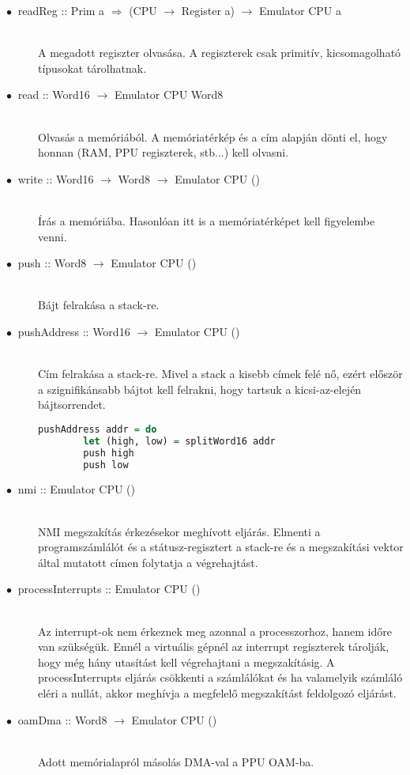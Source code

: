 \begin{description}
	\item[$\bullet\:$ readReg :: Prim a $\Rightarrow$ (CPU $\rightarrow$ Register a) $\rightarrow$ Emulator CPU a] \hfill \\
	A megadott regiszter olvasása. A regiszterek csak primitív, kicsomagolható típusokat tárolhatnak.
	\item[$\bullet\:$ read :: Word16 $\rightarrow$ Emulator CPU Word8] \hfill \\
	Olvasás a memóriából. A memóriatérkép és a cím alapján dönti el, hogy honnan (RAM, PPU regiszterek, stb...) kell olvasni.
	\item[$\bullet\:$ write :: Word16 $\rightarrow$ Word8 $\rightarrow$ Emulator CPU ()] \hfill \\
	Írás a memóriába. Hasonlóan itt is a memóriatérképet kell figyelembe venni.
	\item[$\bullet\:$ push :: Word8 $\rightarrow$ Emulator CPU ()] \hfill \\
	Bájt felrakása a stack-re.
	\item[$\bullet\:$ pushAddress :: Word16 $\rightarrow$ Emulator CPU ()] \hfill \\
	Cím felrakása a stack-re. Mivel a stack a kisebb címek felé nő, ezért először a szignifikánsabb bájtot kell felrakni, hogy tartsuk a kicsi-az-elején bájtsorrendet.
	\begin{lstlisting}[language=Haskell]
	pushAddress addr = do
		let (high, low) = splitWord16 addr 
		push high
		push low
	\end{lstlisting}
	\item[$\bullet\:$ nmi :: Emulator CPU ()] \hfill \\
	NMI megszakítás érkezésekor meghívott eljárás. Elmenti a programszámlálót és a státusz-regisztert a stack-re és a megszakítási vektor által mutatott címen folytatja a végrehajtást.
	\item[$\bullet\:$ processInterrupts :: Emulator CPU ()] \hfill \\
	Az interrupt-ok nem érkeznek meg azonnal a processzorhoz, hanem időre van szükségük.
	Ennél a virtuális gépnél az interrupt regiszterek tárolják, hogy még hány utasítást kell végrehajtani a megszakításig. A processInterrupts eljárás csökkenti a számlálókat és ha valamelyik számláló eléri a nullát, akkor meghívja a megfelelő megszakítást feldolgozó eljárást. 
	\item[$\bullet\:$ oamDma :: Word8 $\rightarrow$ Emulator CPU ()] \hfill \\
	Adott memórialapról másolás DMA-val a PPU OAM-ba.
\end{description}

